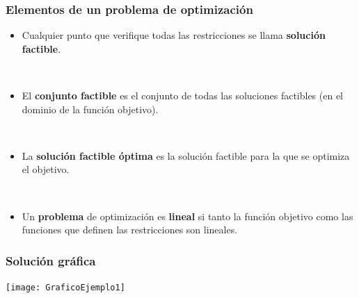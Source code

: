 \documentclass{beamer}
\begin{document}
\begin{frame}
\frametitle{Elementos de un problema de optimización}


\begin{itemize}

\item Cualquier punto que verifique todas las restricciones se llama \textbf{solución factible}.

\

\item El \textbf{conjunto factible} es el conjunto de todas las soluciones factibles (en el dominio de la función objetivo).

\

\item La \textbf{solución factible óptima} es la solución factible para la que se optimiza el objetivo.

\

\item Un \textbf{problema} de optimización es \textbf{lineal} si tanto la función objetivo como las funciones que definen las restricciones son lineales.
\end{itemize}


\end{frame}

\begin{frame}
\frametitle{Solución gráfica}

\texttt{[image: GraficoEjemplo1]}


\end{frame}
\end{document}
